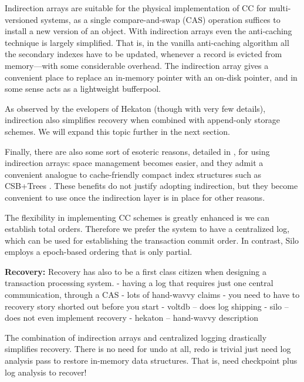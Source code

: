 Indirection arrays are suitable for the physical implementation of CC for multi-versioned systems, as a single compare-and-swap (CAS) operation suffices to install a new version of an object. 
With indirection arrays even the anti-caching technique \cite{DeBrabantPTSZ13} is largely simplified. That is, in the vanilla anti-caching algorithm all the secondary indexes have to be updated, whenever a record is evicted from memory---with some considerable overhead. The indirection array gives a convenient place to replace an in-memory pointer with an on-disk pointer, and in some sense acts as a lightweight bufferpool. 

As observed by the evelopers of Hekaton (though with very few details), indirection also simplifies recovery when combined with append-only storage schemes. We will expand this topic further in the next section.

Finally, there are also some sort of esoteric reasons, detailed in , for using indirection arrays: space management becomes easier, and they admit a convenient analogue to cache-friendly compact index structures such as CSB+Trees \cite{RaoR00}. These benefits do not justify adopting indirection, but they become convenient to use once the indirection layer is in place for other reasons.

The flexibility in implementing CC schemes is greatly enhanced is we can establish total orders. Therefore we prefer the system to have a centralized log, which can be used for establishing the transaction commit order. 
In contrast, Silo employs a epoch-based ordering that is only partial. 

\vspace{2mm}
{\bf Recovery:} 
Recovery has also to be a first class citizen when designing a transaction processing system.
- having a log that requires just one central communication, through a CAS
- lots of hand-wavvy claims
- you need to have to recovery story shorted out before you start
- voltdb -- does log shipping
- silo -- does not even implement recovery
- hekaton -- hand-wavvy description


The combination of indirection arrays and centralized logging drastically simplifies recovery. There is no need for undo at all, redo is trivial just need log analysis pass to restore in-memory data structures. That is, need checkpoint plus log analysis to recover!

